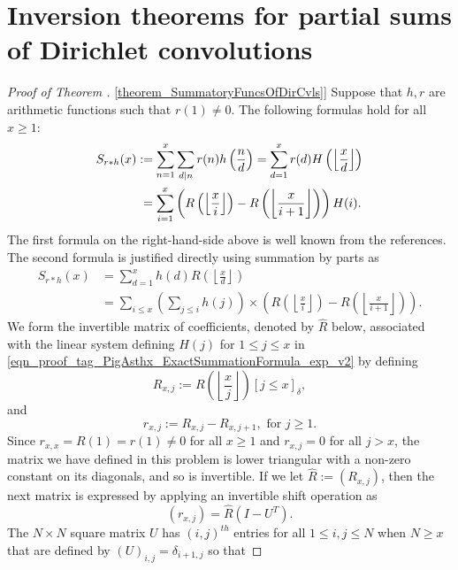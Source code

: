 \documentclass[11pt,reqno,a4letter]{article}
\newcommand{\hlocalref}[1]{\hyperref[#1]{\ref{#1}}}
\numberwithin{equation}{section}
\numberwithin{figure}{section}
\numberwithin{table}{section}
\newcommand{\Iverson}[1]{\ensuremath{\left[#1\right]_{\delta}}}
\newcommand{\floor}[1]{\left\lfloor #1 \right\rfloor}
\newcommand{\Floor}[2]{\ensuremath{\left\lfloor \frac{#1}{#2} \right\rfloor}}
\theoremstyle{plain}
\numberwithin{theorem}{section}
\theoremstyle{definition}
\begin{document}
\section{Inversion theorems for partial sums of Dirichlet convolutions}
\label{Section_PrelimProofs_Config} 
\label{subSection_PrelimProofs_Config_InversionTheorem}

\begin{proof}[Proof of Theorem \hlocalref{theorem_SummatoryFuncsOfDirCvls}] 
\label{proofOf_theorem_SummatoryFuncsOfDirCvls} 
Suppose that $h,r$ are arithmetic functions such that $r(1) \neq 0$. 
The following formulas hold for all $x \geq 1$: 
\begin{align} 
\notag 
S_{r \ast h}(x) & := \sum_{n=1}^{x} \sum_{d|n} r(n) h\left(\frac{n}{d}\right) = 
     \sum_{d=1}^x r(d) H\left(\floor{\frac{x}{d}}\right) \\ 
\label{eqn_proof_tag_PigAsthx_ExactSummationFormula_exp_v2} 
     & \phantom{:} = 
     \sum_{i=1}^x \left(R\left(\floor{\frac{x}{i}}\right) - R\left(\floor{\frac{x}{i+1}}\right)\right) H(i). 
\end{align} 
The first formula on the right-hand-side above is well known from the references. 
The second formula is justified directly using 
summation by parts as \cite[\S 2.10(ii)]{NISTHB} 
\begin{align*} 
S_{r \ast h}(x) & = \sum_{d=1}^x h(d) R\left(\floor{\frac{x}{d}}\right) \\ 
     & = \sum_{i \leq x} \left(\sum_{j \leq i} h(j)\right) \times 
     \left(R\left(\floor{\frac{x}{i}}\right) - 
     R\left(\floor{\frac{x}{i+1}}\right)\right). 
\end{align*} 
We form the invertible matrix of coefficients, denoted by $\hat{R}$ below, 
associated with the linear system defining $H(j)$ for 
$1 \leq j \leq x$ in \eqref{eqn_proof_tag_PigAsthx_ExactSummationFormula_exp_v2} by defining
\[
R_{x,j} := R\left(\Floor{x}{j}\right) \Iverson{j \leq x}, 
\]
and 
\[
r_{x,j} := R_{x,j} - R_{x,j+1}, \text{ for } j \geq 1. 
\] 
Since $r_{x,x} = R(1) = r(1) \neq 0$ for all $x \geq 1$ and $r_{x,j} = 0$ for all $j > x$, 
the matrix we have defined in this problem is lower triangular with a non-zero 
constant on its diagonals, and so is invertible. 
If we let $\hat{R} := (R_{x,j})$, then the next matrix is 
expressed by applying an invertible shift operation as 
\[
(r_{x,j}) = \hat{R} \left(I - U^{T}\right). 
\]
The $N \times N$ square matrix $U$ 
has $(i,j)^{th}$ entries for all $1 \leq i,j \leq N$ when $N \geq x$ that are defined by 
$(U)_{i,j} = \delta_{i+1,j}$ so that 

\end{proof}
\end{document}
